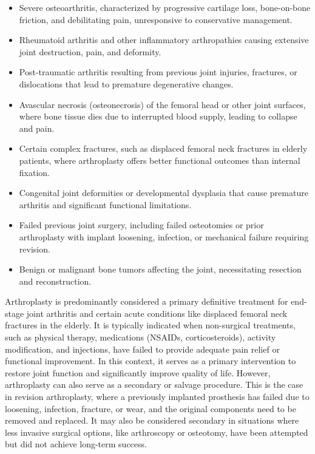 \begin{itemize}
  \item Severe osteoarthritis, characterized by progressive cartilage loss, bone-on-bone friction, and debilitating pain, unresponsive to conservative management.
  \item Rheumatoid arthritis and other inflammatory arthropathies causing extensive joint destruction, pain, and deformity.
  \item Post-traumatic arthritis resulting from previous joint injuries, fractures, or dislocations that lead to premature degenerative changes.
  \item Avascular necrosis (osteonecrosis) of the femoral head or other joint surfaces, where bone tissue dies due to interrupted blood supply, leading to collapse and pain.
  \item Certain complex fractures, such as displaced femoral neck fractures in elderly patients, where arthroplasty offers better functional outcomes than internal fixation.
  \item Congenital joint deformities or developmental dysplasia that cause premature arthritis and significant functional limitations.
  \item Failed previous joint surgery, including failed osteotomies or prior arthroplasty with implant loosening, infection, or mechanical failure requiring revision.
  \item Benign or malignant bone tumors affecting the joint, necessitating resection and reconstruction.
\end{itemize}

Arthroplasty is predominantly considered a primary definitive treatment for end-stage joint arthritis and certain acute conditions like displaced femoral neck fractures in the elderly. It is typically indicated when non-surgical treatments, such as physical therapy, medications (NSAIDs, corticosteroids), activity modification, and injections, have failed to provide adequate pain relief or functional improvement. In this context, it serves as a primary intervention to restore joint function and significantly improve quality of life. However, arthroplasty can also serve as a secondary or salvage procedure. This is the case in revision arthroplasty, where a previously implanted prosthesis has failed due to loosening, infection, fracture, or wear, and the original components need to be removed and replaced. It may also be considered secondary in situations where less invasive surgical options, like arthroscopy or osteotomy, have been attempted but did not achieve long-term success.


